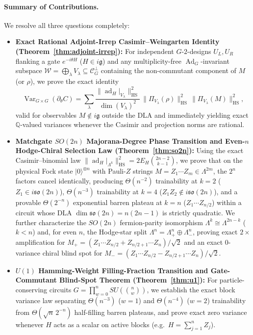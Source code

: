\documentclass[11pt,a4paper]{article}
\theoremstyle{definition}
\theoremstyle{remark}
\newcommand{\QQ}{\mathbb{Q}}
\newcommand{\Var}{\operatorname{Var}}
\newcommand{\Ad}{\operatorname{Ad}}
\newcommand{\ad}{\operatorname{ad}}
\newcommand{\HS}{\mathrm{HS}}
\newcommand{\so}{\mathfrak{so}}
\newcommand{\lieg}{\mathfrak{g}}
\begin{document}
\paragraph{Summary of Contributions.}
We resolve all three questions completely:
\begin{itemize}[leftmargin=1.6em,itemsep=2pt]
  \item \textbf{Exact Rational Adjoint-Irrep Casimir--Weingarten Identity (Theorem~\ref{thm:adjoint-irrep}):} For independent $G$-$2$-designs $U_L, U_R$ flanking a gate $e^{-i\theta H}$ ($H \in i\lieg$) and any multiplicity-free $\Ad_G$-invariant subspace $\mathcal{W} = \bigoplus_\lambda V_\lambda \subseteq \mathcal{C}_G^\perp$ containing the non-commutant component of $M$ (or $\rho$), we prove the exact identity
  \begin{equation}\label{eq:master-intro}
    \Var_{G \times G}(\partial_\theta C)
    = \sum_{\lambda} \frac{\|\ad_H|_{V_\lambda}\|_{\HS}^2}{\dim(V_\lambda)^2}\,
      \|\Pi_{V_\lambda}(\rho)\|_{\HS}^2\, \|\Pi_{V_\lambda}(M)\|_{\HS}^2,
  \end{equation}
  valid for observables $M \notin i\lieg$ outside the DLA and immediately yielding exact $\QQ$-valued variances whenever the Casimir and projection norms are rational.
  \item \textbf{Matchgate $SO(2n)$ Majorana-Degree Phase Transition and Even-$n$ Hodge-Chiral Selection Law (Theorem~\ref{thm:so2n}):} Using the exact Casimir--binomial law $\|\ad_H|_{\Lambda^k}\|_{\HS}^2 = 2 E_H \binom{2n-2}{k-1}$, we prove that on the physical Fock state $|0\rangle^{\otimes n}$ with Pauli-$Z$ strings $M = Z_1\cdots Z_m \in \Lambda^{2m}$, the $2^n$ factors cancel identically, producing $\Theta(n^{-2})$ trainability at $k=2$ ($Z_1 \in i\so(2n)$), $\Theta(n^{-3})$ trainability at $k=4$ ($Z_1 Z_2 \notin i\so(2n)$), and a provable $\Theta(2^{-n})$ exponential barren plateau at $k=n$ ($Z_1\cdots Z_{n/2}$) within a circuit whose DLA $\dim\so(2n) = n(2n-1)$ is strictly quadratic. We further characterize the $SO(2n)$ fermion-parity isomorphism $\Lambda^k \cong \Lambda^{2n-k}$ ($k<n$) and, for even $n$, the Hodge-star split $\Lambda^n = \Lambda^n_+ \oplus \Lambda^n_-$, proving exact $2\times$ amplification for $M_+ = (Z_1\cdots Z_{n/2} + Z_{n/2+1}\cdots Z_n)/\sqrt{2}$ and an exact $0$-variance chiral blind spot for $M_- = (Z_1\cdots Z_{n/2} - Z_{n/2+1}\cdots Z_n)/\sqrt{2}$.
  \item \textbf{$U(1)$ Hamming-Weight Filling-Fraction Transition and Gate-Commutant Blind-Spot Theorem (Theorem~\ref{thm:u1}):} For particle-conserving circuits $G = \prod_{w=0}^n SU(\binom{n}{w})$, we establish the exact block variance law separating $\Theta(n^{-3})$ ($w=1$) and $\Theta(n^{-4})$ ($w=2$) trainability from $\Theta(\sqrt{n}\,2^{-n})$ half-filling barren plateaus, and prove exact zero variance whenever $H$ acts as a scalar on active blocks (e.g.\ $H = \sum_{j=1}^n Z_j$).

\end{itemize}
\end{document}
